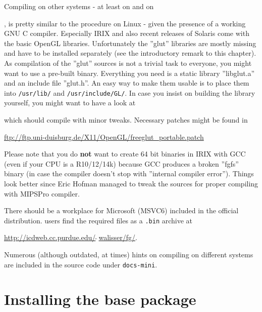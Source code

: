 Compiling on other  systems - at least on  and on

, is pretty similar to the procedure on Linux - given the presence of a
working GNU C compiler. Especially IRIX and also recent releases of
Solaris come with the basic OpenGL libraries.
Unfortunately the ''glut'' libraries are mostly missing and have to be
installed separately (see the introductory remark to this chapter). As
compilation of the ''glut'' sources is not a trivial task to everyone,
you might want to use a pre-built binary. Everything you need is a
static library ''libglut.a'' and an include file ''glut.h''. An easy
way to make them usable is to place them into \texttt{/usr/lib/} and
\texttt{/usr/include/GL/}. In case you insist on building the library
yourself, you might want to have a look at 
\medskip

 \medskip

 \noindent
which should compile with minor tweaks. Necessary patches might be found in
\medskip

\href{ftp://ftp.uni-duisburg.de/X11/OpenGL/freeglut_portable.patch}{ftp://ftp.uni-duisburg.de/X11/OpenGL/freeglut\_portable.patch}
 \medskip

 \noindent
Please note that you do \textbf{not} want to create 64 bit binaries in IRIX
with GCC (even if your CPU is a R10/12/14k) because GCC produces a broken
''fgfs'' binary (in case the compiler doesn't stop with ''internal compiler
error''). Things look better since Eric Hofman
managed to tweak the \FlightGear{} sources for proper compiling with MIPSPro
compiler.

There should be a workplace for Microsoft  (MSVC6) included in the official
\FlightGear{} distribution.  users find the required 
files as a \texttt{.bin} archive at
 \medskip

\href{http://icdweb.cc.purdue.edu/~walisser/fg/}{http://icdweb.cc.purdue.edu/$\tilde{~~}$walisser/fg/}.

Numerous (although outdated, at times) hints on compiling on different systems are included in the source code under \texttt{docs-mini}.

\section{Installing the base package}

